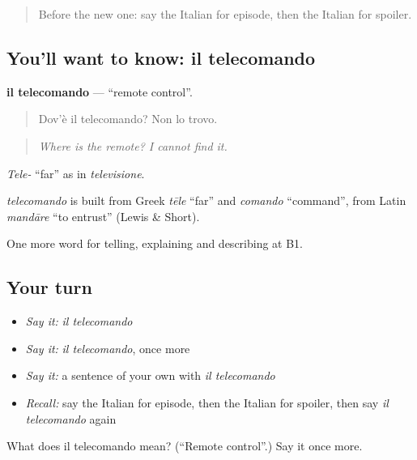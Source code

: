 \label{lesson:IT-C528-telecomando}



\begin{quote}
Before the new one: say the Italian for episode, then the Italian for spoiler.
\end{quote}

\subsection*{You'll want to know: il telecomando}
\textbf{il telecomando} — \textquotedblleft{}remote control\textquotedblright{}.

\begin{quote}
Dov'è il telecomando? Non lo trovo.
\end{quote}

\begin{quote}
\emph{Where is the remote? I cannot find it.}
\end{quote}

\emph{Tele-} \textquotedblleft{}far\textquotedblright{} as in \emph{televisione}.

\begin{cousinweb}
\emph{telecomando} is built from Greek \emph{tēle} \textquotedblleft{}far\textquotedblright{} and \emph{comando} \textquotedblleft{}command\textquotedblright{}, from Latin \emph{mandāre} \textquotedblleft{}to entrust\textquotedblright{} (Lewis \& Short).
\end{cousinweb}

\begin{grammarlens}[title={What you've built}]
One more word for telling, explaining and describing at B1.
\end{grammarlens}

\subsection*{Your turn}
\begin{itemize}
\raggedright
  \item \emph{Say it:} \emph{il telecomando}
  \item \emph{Say it:} \emph{il telecomando}, once more
  \item \emph{Say it:} a sentence of your own with \emph{il telecomando}
  \item \emph{Recall:} say the Italian for episode, then the Italian for spoiler, then say \emph{il telecomando} again
\end{itemize}

\begin{tcolorbox}[breakable,colback=teal!4,colframe=teal!35!black,title={Before you move on}]
What does il telecomando mean? (\textquotedblleft{}Remote control\textquotedblright{}.) Say it once more.
\end{tcolorbox}
